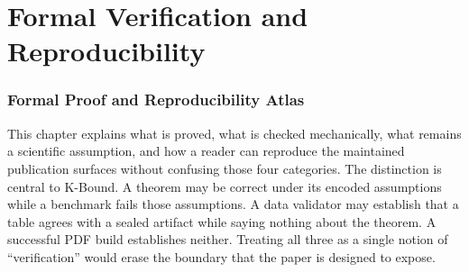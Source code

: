\part{Formal Verification and Reproducibility}
\label{fr:part-formal-reproducibility}

\section{Formal Proof and Reproducibility Atlas}
\label{fr:formal-atlas}

This chapter explains what is proved, what is checked mechanically, what remains a scientific
assumption, and how a reader can reproduce the maintained publication surfaces without confusing
those four categories.  The distinction is central to K-Bound.  A theorem may be correct under its
encoded assumptions while a benchmark fails those assumptions.  A data validator may establish
that a table agrees with a sealed artifact while saying nothing about the theorem.  A successful
PDF build establishes neither.  Treating all three as a single notion of ``verification'' would
erase the boundary that the paper is designed to expose.

